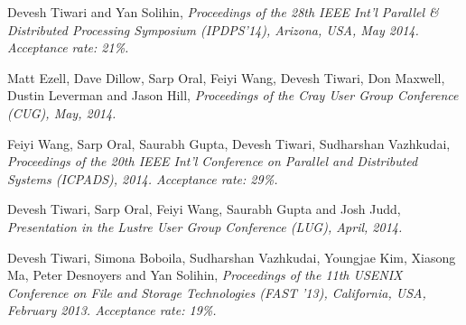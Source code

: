 {\textnormal{\newline Devesh Tiwari and Yan Solihin,\textit{ Proceedings of the 28th IEEE Int'l Parallel \& Distributed Processing Symposium (IPDPS'14), Arizona, USA, May 2014. Acceptance rate: 21\%.\newline}}}{}{}{}

{\textnormal{\newline Matt Ezell, Dave Dillow, Sarp Oral, Feiyi Wang, Devesh Tiwari, Don Maxwell, Dustin Leverman and Jason Hill,\textit{ Proceedings of the Cray User Group Conference (CUG), May, 2014.\newline}}}{}{}{}

{\textnormal{\newline Feiyi Wang, Sarp Oral, Saurabh Gupta, Devesh Tiwari, Sudharshan Vazhkudai,\textit{ Proceedings of the 20th IEEE Int'l Conference on Parallel and Distributed Systems (ICPADS), 2014. Acceptance rate: 29\%.\newline}}}{}{}{}

{\textnormal{\newline Devesh Tiwari, Sarp Oral, Feiyi Wang, Saurabh Gupta and Josh Judd,\textit{ Presentation in the Lustre User Group Conference (LUG), April, 2014.\newline \newline \newline}}}{}{}{}




{\textnormal{\newline Devesh Tiwari, Simona Boboila, Sudharshan Vazhkudai, Youngjae Kim, Xiasong Ma, Peter Desnoyers and Yan Solihin,\textit{ Proceedings of the 11th USENIX Conference on File and Storage Technologies (FAST '13), California, USA, February 2013. Acceptance rate: 19\%.\newline}}}{}{}{}

